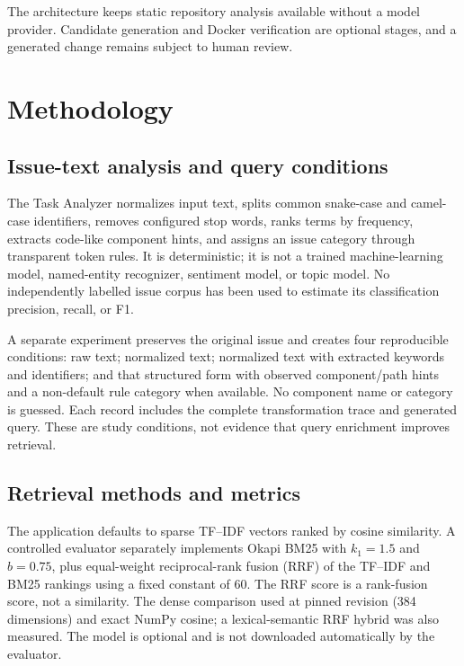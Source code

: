 \documentclass[3p,times,procedia]{elsarticle}
\begin{document}
The architecture keeps static repository analysis available without a model provider. Candidate generation and Docker verification are optional stages, and a generated change remains subject to human review.

\section{Methodology}
\subsection{Issue-text analysis and query conditions}
The Task Analyzer normalizes input text, splits common snake-case and camel-case identifiers, removes configured stop words, ranks terms by frequency, extracts code-like component hints, and assigns an issue category through transparent token rules. It is deterministic; it is not a trained machine-learning model, named-entity recognizer, sentiment model, or topic model. No independently labelled issue corpus has been used to estimate its classification precision, recall, or F1.

A separate \texttt{} experiment preserves the original issue and creates four reproducible conditions: raw text; normalized text; normalized text with extracted keywords and identifiers; and that structured form with observed component/path hints and a non-default rule category when available. No component name or category is guessed. Each record includes the complete transformation trace and generated query. These are study conditions, not evidence that query enrichment improves retrieval.

\subsection{Retrieval methods and metrics}
The application defaults to sparse TF--IDF vectors ranked by cosine similarity. A controlled evaluator separately implements Okapi BM25 with $k_1=1.5$ and $b=0.75$, plus equal-weight reciprocal-rank fusion (RRF) of the TF--IDF and BM25 rankings using a fixed constant of 60. The RRF score is a rank-fusion score, not a similarity. The dense comparison used \texttt{} at pinned revision \texttt{} (384 dimensions) and exact NumPy cosine; a lexical-semantic RRF hybrid was also measured. The model is optional and is not downloaded automatically by the evaluator.
\end{document}
